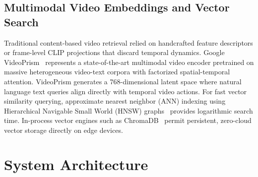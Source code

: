 \documentclass[10pt, conference]{IEEEtran}
\begin{document}
\subsection{Multimodal Video Embeddings and Vector Search}
Traditional content-based video retrieval relied on handcrafted feature descriptors or frame-level CLIP projections that discard temporal dynamics. Google VideoPrism~\cite{videoprism2024} represents a state-of-the-art multimodal video encoder pretrained on massive heterogeneous video-text corpora with factorized spatial-temporal attention. VideoPrism generates a 768-dimensional latent space where natural language text queries align directly with temporal video actions. For fast vector similarity querying, approximate nearest neighbor (ANN) indexing using Hierarchical Navigable Small World (HNSW) graphs~\cite{malkov2018efficient} provides logarithmic search time. In-process vector engines such as ChromaDB~\cite{chromadb2023} permit persistent, zero-cloud vector storage directly on edge devices.

\section{System Architecture}
\label{sec:arch}
\end{document}
